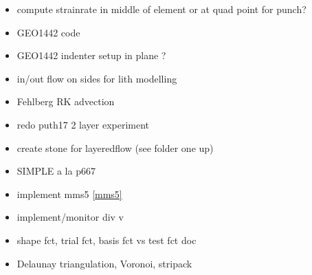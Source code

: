 \begin{itemize}
\item compute strainrate in middle of element or at quad point for punch?
\item GEO1442 code 
\item GEO1442 indenter setup in plane ?
\item in/out flow on sides for lith modelling
\item Fehlberg RK advection
\item redo puth17 2 layer experiment
\item create stone for layeredflow (see folder one up)
\item SIMPLE a la p667 \cite{john16} 
\item implement mms5 \ref{mms5}
\item implement/monitor div v
\item shape fct, trial fct, basis fct vs test fct doc
\item Delaunay triangulation, Voronoi, stripack
\end{itemize}

